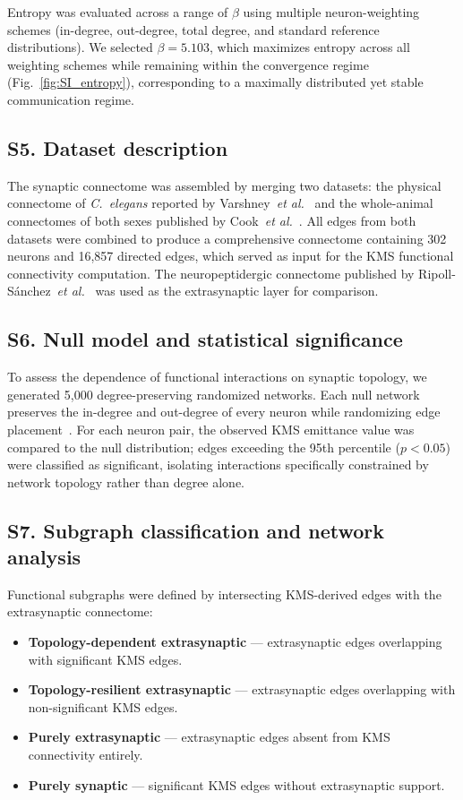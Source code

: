 Entropy was evaluated across a range of $\beta$ using multiple neuron-weighting schemes
(in-degree, out-degree, total degree, and standard reference distributions). We selected
$\beta = 5.103$, which maximizes entropy across all weighting schemes while remaining
within the convergence regime (Fig.~\ref{fig:SI_entropy}), corresponding to a maximally
distributed yet stable communication regime.

\subsection*{S5.\; Dataset description}

The synaptic connectome was assembled by merging two datasets: the physical connectome of
\emph{C.~elegans} reported by Varshney~\emph{et al.}~\cite{varshney2011structural} and
the whole-animal connectomes of both sexes published by Cook~\emph{et
al.}~\cite{cook2019connectome}. All edges from both datasets were combined to produce a
comprehensive connectome containing 302 neurons and 16,857 directed edges, which served
as input for the KMS functional connectivity computation. The neuropeptidergic connectome
published by Ripoll-S\'{a}nchez~\emph{et al.}~\cite{ripoll2023neuropeptidergic} was used
as the extrasynaptic layer for comparison.

\subsection*{S6.\; Null model and statistical significance}

To assess the dependence of functional interactions on synaptic topology, we generated
5,000 degree-preserving randomized networks. Each null network preserves the in-degree
and out-degree of every neuron while randomizing edge
placement~\cite{fosdick2016configuring}. For each neuron pair, the observed KMS emittance
value was compared to the null distribution; edges exceeding the 95th percentile ($p <
0.05$) were classified as significant, isolating interactions specifically constrained by
network topology rather than degree alone.

\subsection*{S7.\; Subgraph classification and network analysis}

Functional subgraphs were defined by intersecting KMS-derived edges with the extrasynaptic
connectome:
\begin{itemize}
  \item \textbf{Topology-dependent extrasynaptic} --- extrasynaptic edges overlapping
        with significant KMS edges.
  \item \textbf{Topology-resilient extrasynaptic} --- extrasynaptic edges overlapping
        with non-significant KMS edges.
  \item \textbf{Purely extrasynaptic} --- extrasynaptic edges absent from KMS
        connectivity entirely.
  \item \textbf{Purely synaptic} --- significant KMS edges without extrasynaptic
        support.
\end{itemize}

